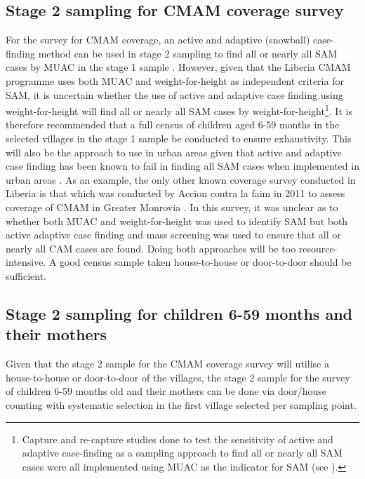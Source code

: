 \documentclass[12pt,a4paper]{book}
\let\rmarkdownfootnote\footnote%
\def\footnote{\protect\rmarkdownfootnote}
\theoremstyle{definition}
\theoremstyle{definition}
\theoremstyle{definition}
\theoremstyle{remark}
\begin{document}
\hypertarget{stage-2-sampling-for-cmam-coverage-survey}{%
\subsection{Stage 2 sampling for CMAM coverage
survey}\label{stage-2-sampling-for-cmam-coverage-survey}}

For the survey for CMAM coverage, an active and adaptive (snowball)
case-finding method can be used in stage 2 sampling to find all or
nearly all SAM cases by MUAC in the stage 1 sample \citep{Myatt:2012tt}.
However, given that the Liberia CMAM programme uses both MUAC and
weight-for-height as independent criteria for SAM, it is uncertain
whether the use of active and adaptive case finding using
weight-for-height will find all or nearly all SAM cases by
weight-for-height\footnote{Capture and re-capture studies done to test
  the sensitivity of active and adaptive case-finding as a sampling
  approach to find all or nearly all SAM cases were all implemented
  using MUAC as the indicator for SAM (see \citet{Wegerdt:2006ux}).}. It
is therefore recommended that a full census of children aged 6-59 months
in the selected villages in the stage 1 sample be conducted to ensure
exhaustivity. This will also be the approach to use in urban areas given
that active and adaptive case finding has been known to fail in finding
all SAM cases when implemented in urban areas \citep{Myatt:2012tt}. As
an example, the only other known coverage survey conducted in Liberia is
that which was conducted by Accion contra la faim in 2011 to assess
coverage of CMAM in Greater Monrovia \citep{AccionContralaFaim:2011vu}.
In this survey, it was unclear as to whether both MUAC and
weight-for-height was used to identify SAM but both active adaptive case
finding and mass screening was used to ensure that all or nearly all CAM
cases are found. Doing both approaches will be too resource-intensive. A
good census sample taken house-to-house or door-to-door should be
sufficient.

\hypertarget{stage-2-sampling-for-children-6-59-months-and-their-mothers}{%
\subsection{Stage 2 sampling for children 6-59 months and their
mothers}\label{stage-2-sampling-for-children-6-59-months-and-their-mothers}}

Given that the stage 2 sample for the CMAM coverage survey will utilise
a house-to-house or door-to-door of the villages, the stage 2 sample for
the survey of children 6-59 months old and their mothers can be done via
door/house counting with systematic selection in the first village
selected per sampling point.
\end{document}

